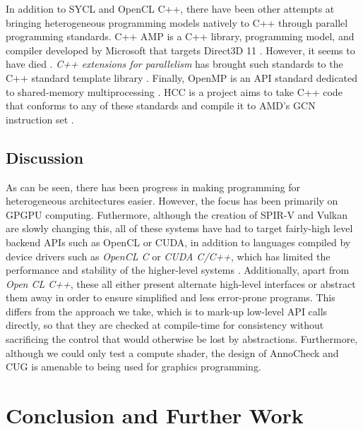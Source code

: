 \documentclass[a4paper,12pt,twoside,openright]{report}
\begin{document}
In addition to SYCL and OpenCL C++, there have been other attempts at bringing
heterogeneous programming models natively to C++ through parallel programming
standards. C++ AMP is a C++ library, programming model, and compiler developed
by Microsoft that targets Direct3D 11 \cite{CAMP}. However, it seems to have
died \cite{CAMPFail1} \cite{CAMPFail2}. \textit{C++ extensions for parallelism}
has brought such standards to the C++ standard template library
\cite{CPPParallelism}. Finally, OpenMP is an API standard dedicated to
shared-memory multiprocessing \cite{OpenMP}. HCC is a project aims to take C++
code that conforms to any of these standards and compile it to AMD's GCN
instruction set \cite{HCC}.

\section{Discussion}

As can be seen, there has been progress in making programming for heterogeneous
architectures easier. However, the focus has been primarily on GPGPU computing.
Futhermore, although the creation of SPIR-V and Vulkan are slowly changing
this, all of these systems have had to target fairly-high level backend APIs
such as OpenCL or CUDA, in addition to languages compiled by device drivers
such as \textit{OpenCL C} or \textit{CUDA C/C++}, which has limited the
performance and stability of the higher-level systems \cite{GLFuzz}.
Additionally, apart from \textit{Open CL C++}, these all either present
alternate high-level interfaces or abstract them away in order to ensure
simplified and less error-prone programs. This differs from the approach we
take, which is to mark-up low-level API calls directly, so that they are
checked at compile-time for consistency without sacrificing the control that
would otherwise be lost by abstractions. Furthermore, although we could only
test a compute shader, the design of AnnoCheck and CUG is amenable to being
used for graphics programming.



\chapter{Conclusion and Further Work}

\label{chp:conclusion_and_further_work}

\end{document}
